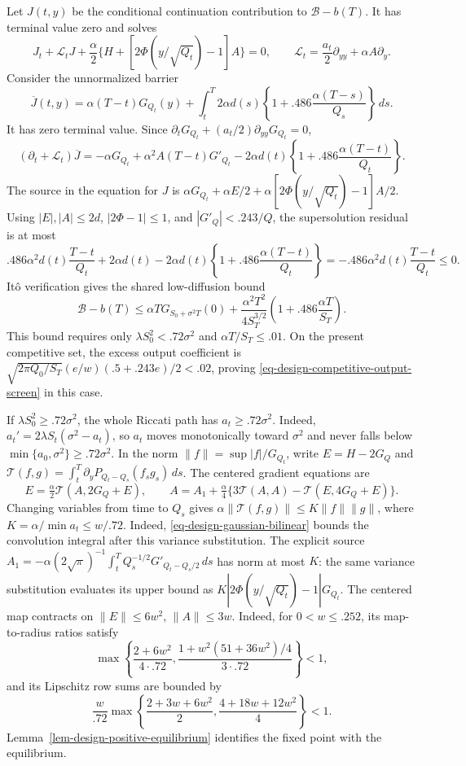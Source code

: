 \documentclass[mnsc]{informs3}
\begin{document}
\begin{APPENDICES}
{Let $J(t,y)$ be the conditional continuation contribution to
$\mathcal B-b(T)$. It has terminal value zero and solves
\[
J_t+\mathscr L_tJ+
\frac\alpha2\{H+[2\Phi(y/\sqrt{Q_t})-1]A\}=0,
\qquad
\mathscr L_t=\frac{a_t}{2}\partial_{yy}+\alpha A\partial_y.
\]
Consider the unnormalized barrier
\[
\overline J(t,y)=\alpha(T-t)G_{Q_t}(y)
+\int_t^T2\alpha d(s)
\left\{1+.486\frac{\alpha(T-s)}{Q_s}\right\}\,ds .
\]
It has zero terminal value. Since
$\partial_tG_{Q_t}+(a_t/2)\partial_{yy}G_{Q_t}=0$,
\[
(\partial_t+\mathscr L_t)\overline J
=-\alpha G_{Q_t}+\alpha^2A(T-t)G'_{Q_t}
-2\alpha d(t)\left\{1+.486\frac{\alpha(T-t)}{Q_t}\right\}.
\]
The source in the equation for $J$ is
$\alpha G_{Q_t}+\alpha E/2+
\alpha[2\Phi(y/\sqrt{Q_t})-1]A/2$.
Using $|E|,|A|\leq2d$, $|2\Phi-1|\leq1$, and
$|G'_Q|<.243/Q$, the supersolution residual is at most
\[
.486\alpha^2d(t)\frac{T-t}{Q_t}+2\alpha d(t)
-2\alpha d(t)\left\{1+.486\frac{\alpha(T-t)}{Q_t}\right\}
=-.486\alpha^2d(t)\frac{T-t}{Q_t}\leq0.
\]
It\^o verification gives the shared low-diffusion bound
\begin{equation}\label{eq-design-low-diffusion-output}
\mathcal B-b(T)\leq\alpha T G_{S_0+\sigma^2T}(0)
+\frac{\alpha^2T^2}{4S_T^{3/2}}
\left(1+.486\frac{\alpha T}{S_T}\right).
\end{equation}
This bound requires only $\lambda S_0^2<.72\sigma^2$ and
$\alpha T/S_T\leq.01$.
On the present competitive set, the excess output coefficient is
$\sqrt{2\pi Q_0/S_T}(e/w)(.5+.243e)/2<.02$, proving
\eqref{eq-design-competitive-output-screen} in this case.

If $\lambda S_0^2\geq.72\sigma^2$, the whole Riccati path has
$a_t\geq.72\sigma^2$. Indeed,
$a_t'=2\lambda S_t(\sigma^2-a_t)$, so $a_t$ moves monotonically toward
$\sigma^2$ and never falls below
$\min\{a_0,\sigma^2\}\geq.72\sigma^2$. In the norm
$\|f\|=\sup|f|/G_{Q_t}$,
write $E=H-2G_Q$ and
$\mathcal T(f,g)=\int_t^T\partial_yP_{Q_t-Q_s}(f_sg_s)\,ds$.
The centered gradient equations are
\[
E=\tfrac\alpha2\mathcal T(A,2G_Q+E),\qquad
A=A_1+\tfrac\alpha4\{3\mathcal T(A,A)-\mathcal T(E,4G_Q+E)\}.
\]
Changing variables from time to $Q_s$ gives
$\alpha\|\mathcal T(f,g)\|\leq K\|f\|\|g\|$,
where $K=\alpha/\min a_t\leq w/.72$.
Indeed, \eqref{eq-design-gaussian-bilinear} bounds the convolution
integral after this variance substitution.
The explicit source
$A_1=-\alpha(2\sqrt\pi)^{-1}\int_t^TQ_s^{-1/2}G'_{Q_t-Q_s/2}\,ds$
has norm at most $K$: the same variance substitution evaluates its
upper bound as $K|2\Phi(y/\sqrt{Q_t})-1|G_{Q_t}$.
The centered map contracts on $\|E\|\leq6w^2$, $\|A\|\leq3w$.
Indeed, for $0<w\leq.252$, its map-to-radius ratios satisfy
\[
\max\left\{\frac{2+6w^2}{4\cdot.72},
\frac{1+w^2(51+36w^2)/4}{3\cdot.72}\right\}<1,
\]
and its Lipschitz row sums are bounded by
\[
\frac{w}{.72}\max\left\{\frac{2+3w+6w^2}{2},
\frac{4+18w+12w^2}{4}\right\}<1.
\]
Lemma~\ref{lem-design-positive-equilibrium} identifies the fixed point
with the equilibrium.

}
\end{APPENDICES}
\end{document}
